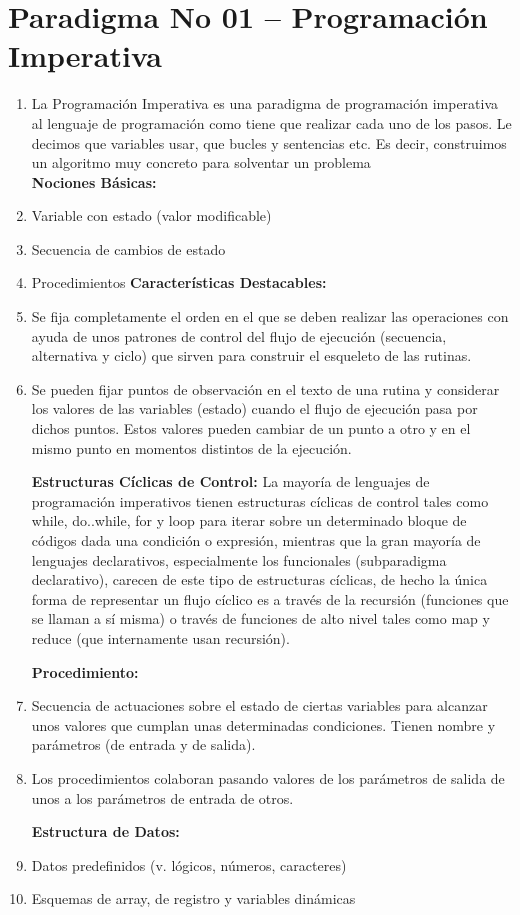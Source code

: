 
\section{Paradigma No 01 – Programación Imperativa} 

\begin{enumerate}[1.]
	\item La Programación Imperativa  es una paradigma de programación imperativa al lenguaje de programación como tiene que realizar cada uno de los pasos. Le decimos que variables usar, que bucles y sentencias etc. Es decir, construimos un algoritmo muy concreto para solventar un problema\\
\textbf{Nociones Básicas:}
\item Variable con estado (valor modificable)
\item Secuencia de cambios de estado
\item Procedimientos 
\textbf{Características Destacables:}
\item Se fija completamente el orden en el que se deben realizar las operaciones con ayuda de unos patrones de control del flujo de ejecución (secuencia, alternativa y ciclo) que sirven para construir el esqueleto de las rutinas.

\item Se pueden fijar puntos de observación en el texto de una rutina y considerar los valores de las variables (estado) cuando el flujo de ejecución pasa por dichos puntos. Estos valores pueden cambiar de un punto a otro y en el mismo punto en momentos distintos de la ejecución. 


\textbf{Estructuras Cíclicas de Control:}
La mayoría de lenguajes de programación imperativos tienen estructuras cíclicas de control tales como while, do..while, for y loop para iterar sobre un determinado bloque de códigos dada una condición o expresión, mientras que la gran mayoría de lenguajes declarativos, especialmente los funcionales (subparadigma declarativo), carecen de este tipo de estructuras cíclicas, de hecho la única forma de representar un flujo cíclico es a través de la recursión (funciones que se llaman a sí misma) o través de funciones de alto nivel tales como map y reduce (que internamente usan recursión).

\textbf{Procedimiento:}
\item Secuencia de actuaciones sobre el estado de ciertas variables para alcanzar unos valores que cumplan unas determinadas condiciones. Tienen nombre y parámetros (de entrada y de salida).
\item Los procedimientos colaboran pasando valores de los parámetros de salida de unos a los parámetros de entrada de otros.

\textbf{Estructura de Datos:}
\item Datos predefinidos (v. lógicos, números, caracteres)
\item Esquemas de array, de registro y variables dinámicas

	

\end{enumerate}

